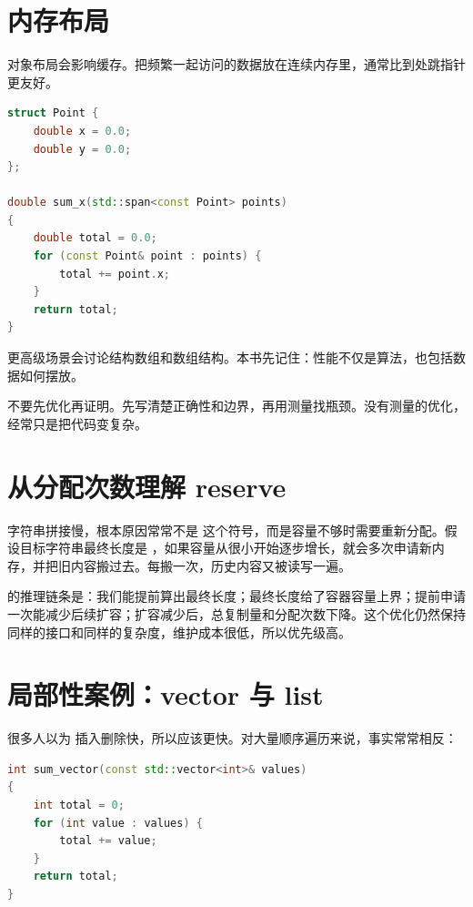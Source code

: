 \section{内存布局}

对象布局会影响缓存。把频繁一起访问的数据放在连续内存里，通常比到处跳指针更友好。

\begin{lstlisting}[language=C++,caption={连续数组适合批量处理}]
struct Point {
    double x = 0.0;
    double y = 0.0;
};

double sum_x(std::span<const Point> points)
{
    double total = 0.0;
    for (const Point& point : points) {
        total += point.x;
    }
    return total;
}
\end{lstlisting}

更高级场景会讨论结构数组和数组结构。本书先记住：性能不仅是算法，也包括数据如何摆放。

\begin{warningbox}
不要先优化再证明。先写清楚正确性和边界，再用测量找瓶颈。没有测量的优化，经常只是把代码变复杂。
\end{warningbox}

\section{从分配次数理解 reserve}

字符串拼接慢，根本原因常常不是 \code{+=} 这个符号，而是容量不够时需要重新分配。假设目标字符串最终长度是 ，如果容量从很小开始逐步增长，就会多次申请新内存，并把旧内容搬过去。每搬一次，历史内容又被读写一遍。

 的推理链条是：我们能提前算出最终长度；最终长度给了容器容量上界；提前申请一次能减少后续扩容；扩容减少后，总复制量和分配次数下降。这个优化仍然保持同样的接口和同样的复杂度，维护成本很低，所以优先级高。

\section{局部性案例：vector 与 list}

很多人以为  插入删除快，所以应该更快。对大量顺序遍历来说，事实常常相反：

\begin{lstlisting}[language=C++,caption={顺序求和更适合连续内存}]
int sum_vector(const std::vector<int>& values)
{
    int total = 0;
    for (int value : values) {
        total += value;
    }
    return total;
}
\end{lstlisting}

